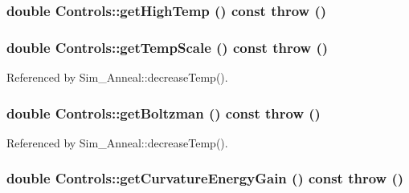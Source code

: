 \hypertarget{classControls_060a80a65cbb830e71c0edce3cb837a3}{
\subsubsection[getHighTemp]{\setlength{\rightskip}{0pt plus 5cm}double Controls::getHighTemp () const  throw ()}}
\label{classControls_060a80a65cbb830e71c0edce3cb837a3}


\hypertarget{classControls_2a6718effb5b99b4bacc07e2c274a371}{
\subsubsection[getTempScale]{\setlength{\rightskip}{0pt plus 5cm}double Controls::getTempScale () const  throw ()}}
\label{classControls_2a6718effb5b99b4bacc07e2c274a371}




Referenced by Sim\_\-Anneal::decreaseTemp().\hypertarget{classControls_c185f29a09bb9eb583ecd9bf4324f217}{
\subsubsection[getBoltzman]{\setlength{\rightskip}{0pt plus 5cm}double Controls::getBoltzman () const  throw ()}}
\label{classControls_c185f29a09bb9eb583ecd9bf4324f217}




Referenced by Sim\_\-Anneal::decreaseTemp().\hypertarget{classControls_821c182631d0e65f2262f2824e8f1f1a}{
\subsubsection[getCurvatureEnergyGain]{\setlength{\rightskip}{0pt plus 5cm}double Controls::getCurvatureEnergyGain () const  throw ()}}
\label{classControls_821c182631d0e65f2262f2824e8f1f1a}


